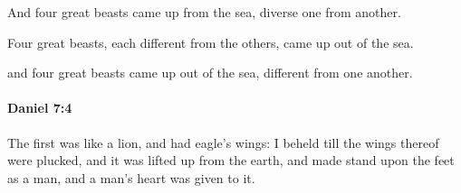 			\begin{versebox}
					\item[BHS] 
					\item[LXX] 
					\item[ASV] And four great beasts came up from the sea, diverse one from another.
					\item[NIV] Four great beasts, each different from the others, came up out of the sea.
					\item[NRSV] and four great beasts came up out of the sea, different from one another.
			\end{versebox}

		\paragraph{Daniel 7:4} %
			\label{DANIEL-7-4}

			The first was like a lion, and had eagle’s wings: I beheld till the wings thereof were plucked, and it was lifted up from the earth, and made stand upon the feet as a man, and a man’s heart was given to it.

